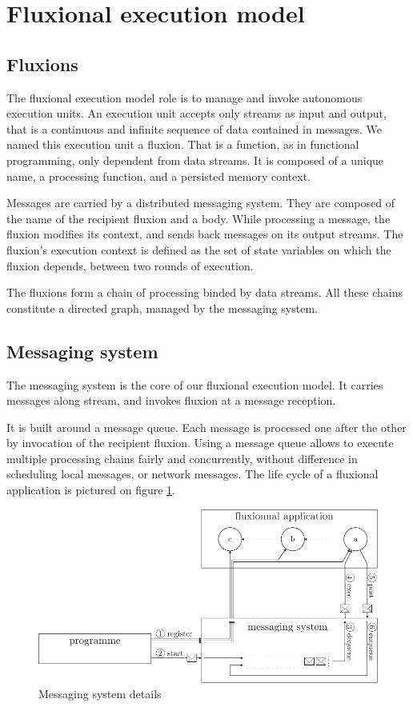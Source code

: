 \section{Fluxional execution model} \label{section:model}

\subsection{Fluxions}

The fluxional execution model role is to manage and invoke autonomous execution units.
An execution unit accepts only streams as input and output, that is a continuous and infinite sequence of data contained in messages.
We named this execution unit a fluxion.
That is a function, as in functional programming, only dependent from data streams.
It is composed of a unique name, a processing function, and a persisted memory context.

Messages are carried by a distributed messaging system.
They are composed of the name of the recipient fluxion and a body.
While processing a message, the fluxion modifies its context, and sends back messages on its output streams.
The fluxion's execution context is defined as the set of state variables on which the fluxion depends, between two rounds of execution.

The fluxions form a chain of processing binded by data streams.
All these chains constitute a directed graph, managed by the messaging system.

\subsection{Messaging system}

The messaging system is the core of our fluxional execution model.
It carries messages along stream, and invokes fluxion at a message reception.

It is built around a message queue.
Each message is processed one after the other by invocation of the recipient fluxion.
Using a message queue allows to execute multiple processing chains fairly and concurrently, without difference in scheduling local messages, or network messages.
The life cycle of a fluxional application is pictured on figure \ref{fig:MesSys}.

\begin{figure}[h!]
  \includegraphics[width=\linewidth]{ressources/schema-message.pdf}
  \caption{Messaging system details}
  \label{fig:MesSys}
\end{figure}

